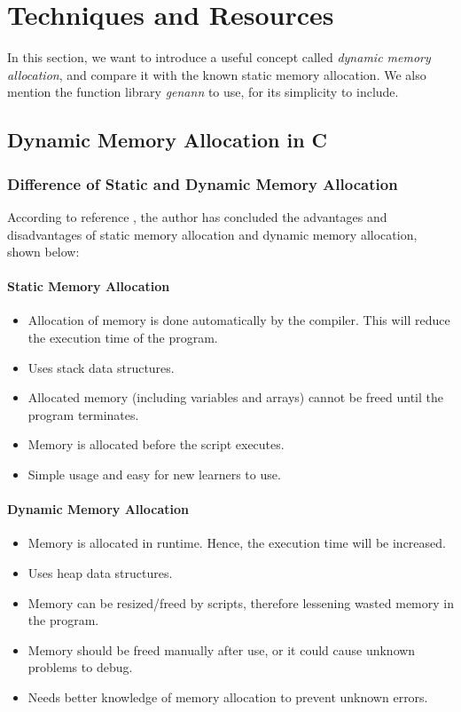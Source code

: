 	\section{Techniques and Resources}
	In this section, we want to introduce a useful concept called \emph{dynamic memory allocation}, and compare it with the known static memory allocation. We also mention the function library \emph{genann} to use, for its simplicity to include. 
 	\subsection{Dynamic Memory Allocation in C}
	    \subsubsection{Difference of Static and Dynamic Memory Allocation }
	    According to reference \cite{ref1}, the author has concluded the advantages and disadvantages of static memory allocation and dynamic memory allocation, shown below:
	    \paragraph{Static Memory Allocation}
	    \begin{itemize}
	        \item Allocation of memory is done automatically by the compiler. This will reduce the execution time of the program.
	        \item Uses stack data structures.
	        \item Allocated memory (including variables and arrays) cannot be freed until the program terminates.
	        \item Memory is allocated before the script executes.
	        \item Simple usage and easy for new learners to use.
	    \end{itemize}
	    \paragraph{Dynamic Memory Allocation}
	    \begin{itemize}
	        \item Memory is allocated in runtime. Hence, the execution time will be increased.
	        \item Uses heap data structures.
	        \item Memory can be resized/freed by scripts, therefore lessening wasted memory in the program.
	        \item Memory should be freed manually after use, or it could cause unknown problems to debug.  
	        \item Needs better knowledge of memory allocation to prevent unknown errors.
	        
	    \end{itemize}
	   
